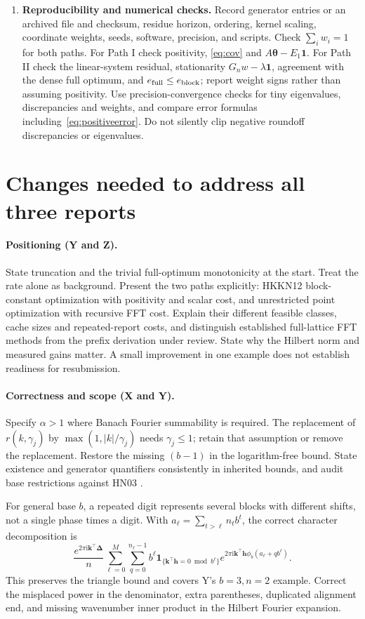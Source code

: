 \documentclass[11pt]{article}
\newcommand{\ii}{\mathrm{i}}
\newcommand{\bbone}{\boldsymbol{1}}
\newcommand{\btheta}{\boldsymbol{\theta}}
\newcommand{\bk}{\boldsymbol{k}}
\newcommand{\bh}{\boldsymbol{h}}
\newcommand{\bDelta}{\boldsymbol{\Delta}}
\begin{document}
\begin{enumerate}
\item \textbf{Reproducibility and numerical checks.}
Record generator entries or an archived file and checksum, residue
horizon, ordering, kernel scaling, coordinate weights, seeds, software,
precision, and scripts.
Check $\sum_iw_i=1$ for both paths. For Path I check positivity,
\eqref{eq:cov} and $A\btheta-E_1\bbone$. For Path II check the
linear-system residual, stationarity $G_nw-\lambda\bbone$,
agreement with the dense full optimum, and $e_{\rm full}\le e_{\rm block}$;
report weight signs rather than assuming positivity.
Use precision-convergence checks for tiny eigenvalues, discrepancies
and weights, and compare error formulas including~\eqref{eq:positiveerror}.
Do not silently clip negative roundoff discrepancies or eigenvalues.
\end{enumerate}

\section{Changes needed to address all three reports}
\paragraph{Positioning (Y and Z).}
State truncation and the trivial full-optimum monotonicity at the start.
Treat the rate alone as background. Present the two paths explicitly:
HKKN12 block-constant optimization with positivity and scalar cost,
and unrestricted point optimization with recursive FFT cost. Explain
their different feasible classes, cache sizes and repeated-report costs,
and distinguish established full-lattice FFT methods from the prefix
derivation under review. State why the Hilbert norm and measured gains matter.
A small improvement in one example does not establish readiness
for resubmission.

\paragraph{Correctness and scope (X and Y).}
Specify $\alpha>1$ where Banach Fourier summability is required.
The replacement of $r(k,\gamma_j)$ by $\max(1,|k|/\gamma_j)$
needs $\gamma_j\le1$; retain that assumption or remove the replacement.
Restore the missing $(b-1)$ in the logarithm-free bound.
State existence and generator quantifiers consistently in inherited
bounds, and audit base restrictions against HN03 \cite{HN03}.

For general base $b$, a repeated digit represents several blocks with
different shifts, not a single phase times a digit.
With $a_\ell=\sum_{t>\ell}n_tb^t$, the correct character decomposition is
\[
 \frac{e^{2\pi\ii\bk^\top\bDelta}}{n}
 \sum_{\ell=0}^M\sum_{q=0}^{n_\ell-1}
 b^\ell\bbone_{\{\bk^\top\bh=0\bmod b^\ell\}}
 e^{2\pi\ii\bk^\top\bh\phi_b(a_\ell+qb^\ell)}.
\]
This preserves the triangle bound and covers Y's $b=3,n=2$ example.
Correct the misplaced power in the denominator, extra parentheses,
duplicated alignment end, and missing wavenumber inner product
in the Hilbert Fourier expansion.
\end{document}

